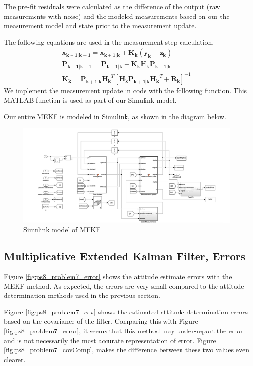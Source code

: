 The pre-fit residuals were calculated as the difference of the output (raw measurements with noise) and the modeled measurements based on our the measurement model and state prior to the measurement update.

The following equations are used in the measurement step calculation.
\begin{align*}
    \mathbf{x_{k+1 | k+1}} = \mathbf{x_{k+1 | k}} + \mathbf{K_k}
    (\mathbf{y_k} - \mathbf{z_k}) \\
    \mathbf{P_{k+1 | k+1}} = \mathbf{P_{k+1 | k}} - 
    \mathbf{K_k} \mathbf{H_k} \mathbf{P_{k+1 | k}} \\
    \mathbf{K_k} = \mathbf{P_{k+1 | k}} \mathbf{H_k}^T [\mathbf{H_k} \mathbf{P_{k+1 | k}} \mathbf{H_k}^T + \mathbf{R_k}]^{-1}
\end{align*}
We implement the measurement update in code with the following function. This MATLAB function is used as part of our Simulink model.



Our entire MEKF is modeled in Simulink, as shown in the diagram below.

\begin{figure}[H]
\centering
\includegraphics[scale=0.27]{Images/ps8_problem5_simulink.png}
\caption{Simulink model of MEKF}
\label{fig:ps8_problem5_simulink}
\end{figure}

\subsection{Multiplicative Extended Kalman Filter, Errors}
Figure \ref{fig:ps8_problem7_error} shows the attitude estimate errors with the MEKF method. As expected, the errors are very small compared to the attitude determination methods used in the previous section.

Figure \ref{fig:ps8_problem7_cov} shows the estimated attitude determination errors based on the covariance of the filter. Comparing this with Figure \ref{fig:ps8_problem7_error}, it seems that this method may under-report the error and is not necessarily the most accurate representation of error. Figure \ref{fig:ps8_problem7_covComp}, makes the difference between these two values even clearer.

